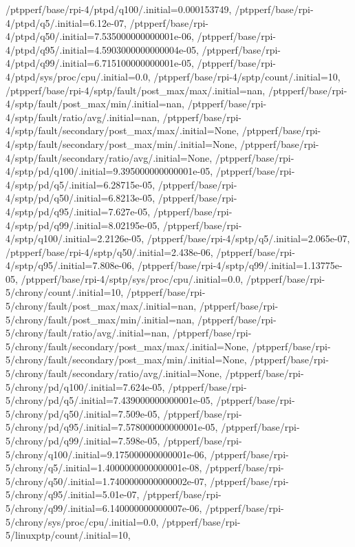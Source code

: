 {    /ptpperf/base/rpi-4/ptpd/q100/.initial=0.000153749,
    /ptpperf/base/rpi-4/ptpd/q5/.initial=6.12e-07,
    /ptpperf/base/rpi-4/ptpd/q50/.initial=7.535000000000001e-06,
    /ptpperf/base/rpi-4/ptpd/q95/.initial=4.5903000000000004e-05,
    /ptpperf/base/rpi-4/ptpd/q99/.initial=6.715100000000001e-05,
    /ptpperf/base/rpi-4/ptpd/sys/proc/cpu/.initial=0.0,
    /ptpperf/base/rpi-4/sptp/count/.initial=10,
    /ptpperf/base/rpi-4/sptp/fault/post_max/max/.initial=nan,
    /ptpperf/base/rpi-4/sptp/fault/post_max/min/.initial=nan,
    /ptpperf/base/rpi-4/sptp/fault/ratio/avg/.initial=nan,
    /ptpperf/base/rpi-4/sptp/fault/secondary/post_max/max/.initial=None,
    /ptpperf/base/rpi-4/sptp/fault/secondary/post_max/min/.initial=None,
    /ptpperf/base/rpi-4/sptp/fault/secondary/ratio/avg/.initial=None,
    /ptpperf/base/rpi-4/sptp/pd/q100/.initial=9.395000000000001e-05,
    /ptpperf/base/rpi-4/sptp/pd/q5/.initial=6.28715e-05,
    /ptpperf/base/rpi-4/sptp/pd/q50/.initial=6.8213e-05,
    /ptpperf/base/rpi-4/sptp/pd/q95/.initial=7.627e-05,
    /ptpperf/base/rpi-4/sptp/pd/q99/.initial=8.02195e-05,
    /ptpperf/base/rpi-4/sptp/q100/.initial=2.2126e-05,
    /ptpperf/base/rpi-4/sptp/q5/.initial=2.065e-07,
    /ptpperf/base/rpi-4/sptp/q50/.initial=2.438e-06,
    /ptpperf/base/rpi-4/sptp/q95/.initial=7.808e-06,
    /ptpperf/base/rpi-4/sptp/q99/.initial=1.13775e-05,
    /ptpperf/base/rpi-4/sptp/sys/proc/cpu/.initial=0.0,
    /ptpperf/base/rpi-5/chrony/count/.initial=10,
    /ptpperf/base/rpi-5/chrony/fault/post_max/max/.initial=nan,
    /ptpperf/base/rpi-5/chrony/fault/post_max/min/.initial=nan,
    /ptpperf/base/rpi-5/chrony/fault/ratio/avg/.initial=nan,
    /ptpperf/base/rpi-5/chrony/fault/secondary/post_max/max/.initial=None,
    /ptpperf/base/rpi-5/chrony/fault/secondary/post_max/min/.initial=None,
    /ptpperf/base/rpi-5/chrony/fault/secondary/ratio/avg/.initial=None,
    /ptpperf/base/rpi-5/chrony/pd/q100/.initial=7.624e-05,
    /ptpperf/base/rpi-5/chrony/pd/q5/.initial=7.439000000000001e-05,
    /ptpperf/base/rpi-5/chrony/pd/q50/.initial=7.509e-05,
    /ptpperf/base/rpi-5/chrony/pd/q95/.initial=7.578000000000001e-05,
    /ptpperf/base/rpi-5/chrony/pd/q99/.initial=7.598e-05,
    /ptpperf/base/rpi-5/chrony/q100/.initial=9.175000000000001e-06,
    /ptpperf/base/rpi-5/chrony/q5/.initial=1.4000000000000001e-08,
    /ptpperf/base/rpi-5/chrony/q50/.initial=1.7400000000000002e-07,
    /ptpperf/base/rpi-5/chrony/q95/.initial=5.01e-07,
    /ptpperf/base/rpi-5/chrony/q99/.initial=6.140000000000007e-06,
    /ptpperf/base/rpi-5/chrony/sys/proc/cpu/.initial=0.0,
    /ptpperf/base/rpi-5/linuxptp/count/.initial=10,
}
